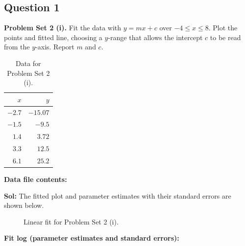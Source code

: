 \documentclass{book}
\begin{document}
\subsection*{Question 1}
\noindent\textbf{Problem Set 2 (i).} Fit the data with $y=mx+c$ over $-4\le x\le8$. Plot the points and fitted line, choosing a $y$-range that allows the intercept $c$ to be read from the $y$-axis. Report $m$ and $c$.
\begin{table}[H]
\centering
\caption{Data for Problem Set 2 (i).}
\begin{tabular}{|r|r|}
\hline
$x$ & $y$ \\ \hline
$-2.7$ & $-15.07$ \\ \hline
$-1.5$ & $-9.5$ \\ \hline
$1.4$ & $3.72$ \\ \hline
$3.3$ & $12.5$ \\ \hline
$6.1$ & $25.2$ \\ \hline
\end{tabular}
\end{table}
\noindent\textbf{Data file contents:}

\noindent\textbf{Sol:} The fitted plot and parameter estimates with their standard errors are shown below.

\begin{figure}[H]
    \centering
    
    \caption{Linear fit for Problem Set 2 (i).}
\end{figure}
\noindent\textbf{Fit log (parameter estimates and standard errors):}

\newpage
\end{document}
